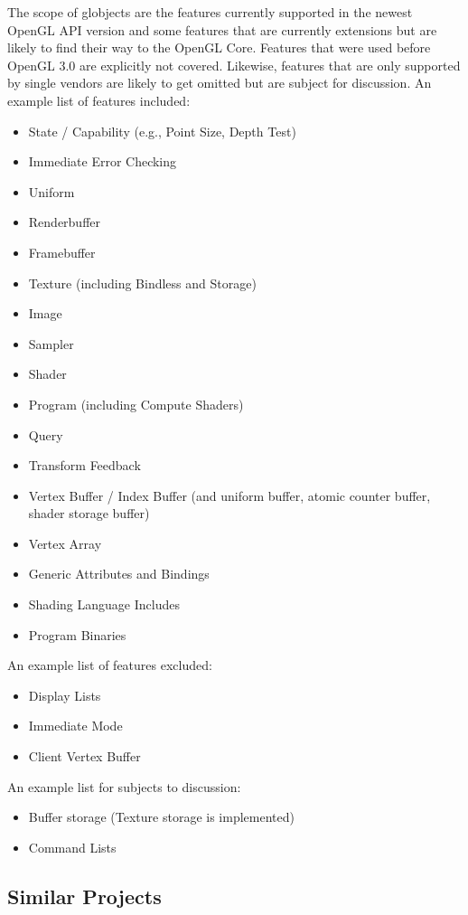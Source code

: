 \documentclass{article}
\begin{document}
The scope of globjects are the features currently supported in the newest OpenGL API version and some features that are currently extensions but are likely to find their way to the OpenGL Core. Features that were used before OpenGL 3.0 are explicitly not covered. Likewise, features that are only supported by single vendors are likely to get omitted but are subject for discussion.
An example list of features included:
\begin{itemize}
	\item State / Capability (e.g., Point Size, Depth Test)
	\item Immediate Error Checking
	\item Uniform
	\item Renderbuffer
	\item Framebuffer
	\item Texture (including Bindless and Storage)
	\item Image
	\item Sampler
	\item Shader
	\item Program (including Compute Shaders)
	\item Query
	\item Transform Feedback
	\item Vertex Buffer / Index Buffer (and uniform buffer, atomic counter buffer, shader storage buffer)
	\item Vertex Array
	\item Generic Attributes and Bindings
	\item Shading Language Includes
	\item Program Binaries
\end{itemize}

\noindent An example list of features excluded:
\begin{itemize}
	\item Display Lists
	\item Immediate Mode
	\item Client Vertex Buffer
\end{itemize}

\noindent An example list for subjects to discussion:
\begin{itemize}
	\item Buffer storage (Texture storage is implemented)
	\item Command Lists
\end{itemize}

\subsection{Similar Projects}
\end{document}
